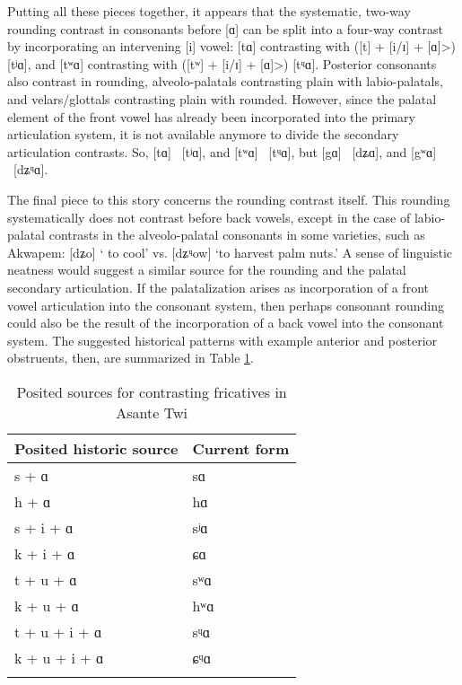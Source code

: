 \documentclass[output=paper,colorlinks,citecolor=brown]{langscibook}
\begin{document}
\begin{sloppypar}
Putting all these pieces together, it appears that the systematic, two-way rounding contrast in consonants before [ɑ] can be split into a four-way contrast by incorporating an intervening [i] vowel: [tɑ] contrasting with ([t] + [i/ɪ] + [ɑ]>) [tʲɑ], and [tʷɑ] contrasting with ([tʷ] + [i/ɪ] + [ɑ]>) [tᶣɑ]. Posterior consonants also contrast in rounding, alveolo-palatals contrasting plain with labio-palatals, and velars/glottals contrasting plain with rounded. However, since the palatal element of the front vowel has already been incorporated into the primary articulation system, it is not available anymore to divide the secondary articulation contrasts. So, [tɑ] \Leftrightarrow\ [tʲɑ], and [tʷɑ] \Leftrightarrow\ [tᶣɑ], but [gɑ] \Leftrightarrow\ [dʑɑ], and [gʷɑ] \Leftrightarrow\ [dʑᶣɑ]. 
\end{sloppypar}

The final piece to this story concerns the rounding contrast itself. This rounding systematically does not contrast before back vowels, except in the case of labio-palatal contrasts in the alveolo-palatal consonants in some varieties, such as Akwapem: [dʑo] ‘ to cool’ vs. [dʑᶣow] ‘to harvest palm nuts.’ A sense of linguistic neatness would suggest a similar source for the rounding  and the palatal secondary articulation. If the palatalization arises as incorporation of a front vowel articulation into the consonant system, then perhaps consonant rounding could also be the result of the incorporation of a back vowel into the consonant system. The suggested historical patterns  with example anterior and posterior obstruents, then, are summarized in Table \ref{tab:PositedSource}.

\begin{table}
\caption{Posited sources for contrasting fricatives in Asante Twi}
\label{tab:PositedSource}
 \begin{tabular}{ll}
 \lsptoprule
 Posited historic source &Current form\\
 \midrule
 s + ɑ & sɑ \\
 h + ɑ &hɑ \\
 s + i + ɑ & sʲɑ \\
 k + i + ɑ &ɕɑ \\
 t + u + ɑ &sʷɑ \\
 k + u + ɑ &hʷɑ \\
 t + u + i + ɑ &sᶣɑ \\
 k + u + i + ɑ &ɕᶣɑ \\
 \lspbottomrule
 \end{tabular}
\end{table}
\end{document}
